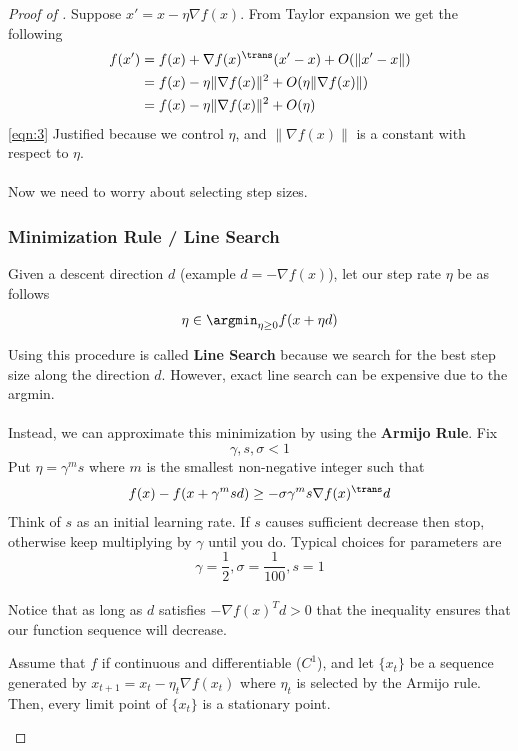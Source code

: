 \begin{proof}[Proof of ]
Suppose $x' = x - \eta \nabla f(x)$. From Taylor expansion we get the following
\begin{align}
    f(x') &= f(x) + \nabla f(x)^\trans (x' - x) + O(\|x' - x\|) \nonumber\\
    &= f(x) - \eta\|\nabla f(x)\|^2 + O(\eta \|\nabla f(x)\|) \nonumber \\
    &= f(x) - \eta \|\nabla f(x)\|^2 + O(\eta) \label{eqn:3}
\end{align}
\ref{eqn:3} Justified because we control $\eta$, and $\|\nabla f(x)\|$ is a constant with respect to $\eta$. \\
\\
Now we need to worry about selecting step sizes.
\subsubsection{Minimization Rule / Line Search}
Given a descent direction $d$ (example $d = - \nabla f(x)$), let our step rate $\eta$ be as follows
\[
    \eta \in \argmin_{\eta \ge 0} f(x + \eta d)
\]

Using this procedure is called \textbf{Line Search} because we search for the best step size along the direction $d$. However, exact line search can be expensive due to the argmin. \\
\\
Instead, we can approximate this minimization by using the \textbf{Armijo Rule}. 
Fix 
\[
    \gamma, s, \sigma < 1
\]
Put $\eta = \gamma^m s$ where $m$ is the smallest non-negative integer such that
\[
    f(x) - f(x + \gamma^m s d) \ge - \sigma \gamma^m s \nabla f(x)^\trans d
\]
Think of $s$ as an initial learning rate. If $s$ causes sufficient decrease then stop, otherwise keep multiplying by $\gamma$ until you do. Typical choices for parameters are 
\[
    \gamma = \frac{1}{2}, \sigma = \frac{1}{100}, s = 1
\]
\\
Notice that as long as $d$ satisfies $-\nabla f(x)^Td > 0$ that the inequality ensures that our function sequence will decrease.

\begin{proposition}
Assume that $f$ if continuous and differentiable ($C^1$), and let $\{x_t\}$ be a sequence generated by $x_{t+1} = x_t - \eta_t \nabla f(x_t)$ where $\eta_t$ is selected by the Armijo rule. Then, every limit point of $\{x_t\}$ is a stationary point.
\end{proposition}


\end{proof}

